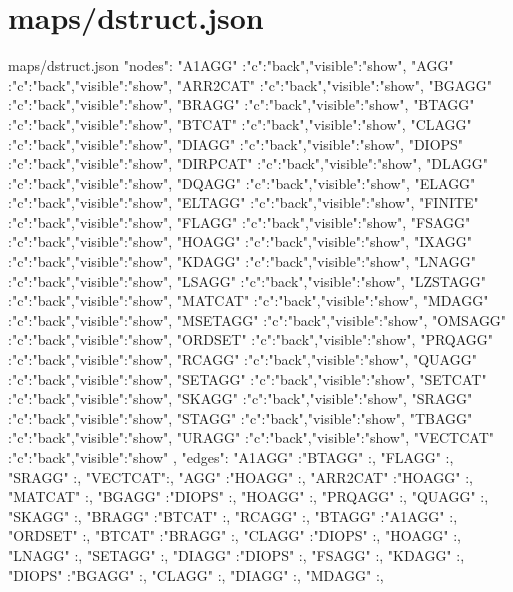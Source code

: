 \documentclass{article}
\begin{document}
\section{maps/dstruct.json}
\begin{chunk}{maps/dstruct.json}
{"nodes":
 {
  "A1AGG"   :{"c":"back","visible":"show"},
  "AGG"     :{"c":"back","visible":"show"},
  "ARR2CAT" :{"c":"back","visible":"show"},
  "BGAGG"   :{"c":"back","visible":"show"},
  "BRAGG"   :{"c":"back","visible":"show"},
  "BTAGG"   :{"c":"back","visible":"show"},
  "BTCAT"   :{"c":"back","visible":"show"},
  "CLAGG"   :{"c":"back","visible":"show"},
  "DIAGG"   :{"c":"back","visible":"show"},
  "DIOPS"   :{"c":"back","visible":"show"},
  "DIRPCAT" :{"c":"back","visible":"show"},
  "DLAGG"   :{"c":"back","visible":"show"},
  "DQAGG"   :{"c":"back","visible":"show"},
  "ELAGG"   :{"c":"back","visible":"show"},
  "ELTAGG"  :{"c":"back","visible":"show"},
  "FINITE"  :{"c":"back","visible":"show"},
  "FLAGG"   :{"c":"back","visible":"show"},
  "FSAGG"   :{"c":"back","visible":"show"},
  "HOAGG"   :{"c":"back","visible":"show"},
  "IXAGG"   :{"c":"back","visible":"show"},
  "KDAGG"   :{"c":"back","visible":"show"},
  "LNAGG"   :{"c":"back","visible":"show"},
  "LSAGG"   :{"c":"back","visible":"show"},
  "LZSTAGG" :{"c":"back","visible":"show"},
  "MATCAT"  :{"c":"back","visible":"show"},
  "MDAGG"   :{"c":"back","visible":"show"},
  "MSETAGG" :{"c":"back","visible":"show"},
  "OMSAGG"  :{"c":"back","visible":"show"},
  "ORDSET"  :{"c":"back","visible":"show"},
  "PRQAGG"  :{"c":"back","visible":"show"},
  "RCAGG"   :{"c":"back","visible":"show"},
  "QUAGG"   :{"c":"back","visible":"show"},
  "SETAGG"  :{"c":"back","visible":"show"},
  "SETCAT"  :{"c":"back","visible":"show"},
  "SKAGG"   :{"c":"back","visible":"show"},
  "SRAGG"   :{"c":"back","visible":"show"},
  "STAGG"   :{"c":"back","visible":"show"},
  "TBAGG"   :{"c":"back","visible":"show"},
  "URAGG"   :{"c":"back","visible":"show"},
  "VECTCAT" :{"c":"back","visible":"show"}
 },
 "edges":
 {
  "A1AGG"   :{"BTAGG"  :{}, "FLAGG"  :{}, "SRAGG"  :{}, "VECTCAT":{}},
  "AGG"     :{"HOAGG"  :{}},
  "ARR2CAT" :{"HOAGG"  :{}, "MATCAT" :{}},
  "BGAGG"   :{"DIOPS"  :{}, "HOAGG"  :{}, "PRQAGG" :{}, "QUAGG"  :{}, 
              "SKAGG"  :{}},
  "BRAGG"   :{"BTCAT"  :{}, "RCAGG"  :{}},
  "BTAGG"   :{"A1AGG"  :{}, "ORDSET" :{}},
  "BTCAT"   :{"BRAGG"  :{}},
  "CLAGG"   :{"DIOPS"  :{}, "HOAGG"  :{}, "LNAGG"  :{}, "SETAGG" :{}},
  "DIAGG"   :{"DIOPS"  :{}, "FSAGG"  :{}, "KDAGG"  :{}},
  "DIOPS"   :{"BGAGG"  :{}, "CLAGG"  :{}, "DIAGG"  :{}, "MDAGG"  :{}},
}}
\end{chunk}
\end{document}

